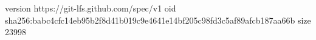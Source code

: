 version https://git-lfs.github.com/spec/v1
oid sha256:babc4cfc14eb95b2f8d41b019c9e4641e14bf205c98fd3c5af89afcb187aa66b
size 23998
